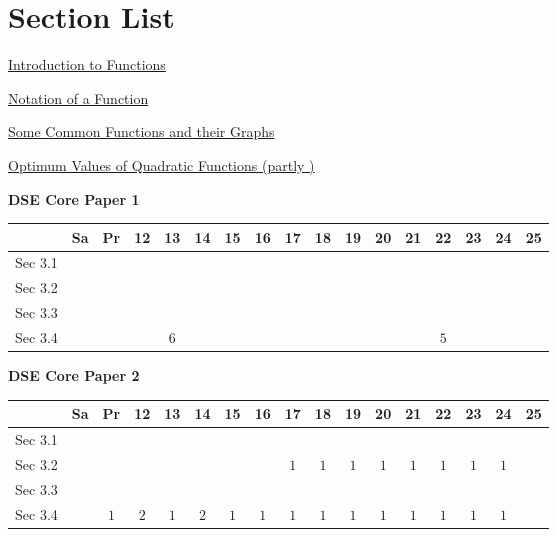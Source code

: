 \documentclass[12pt, a4paper]{article}
\begin{document}
\section*{Section List}
\begin{enumx}[label=Sec 3.\arabic*\ ]
\item \hyperref[section:4-3-1]{Introduction to Functions }
\item \hyperref[section:4-3-2]{Notation of a Function }
\item \hyperref[section:4-3-3]{Some Common Functions and their Graphs}
\item \hyperref[section:4-3-4]{Optimum Values of Quadratic Functions (partly \NF)}
\end{enumx}
\begin{absolutelynopagebreak}
\begin{center}
\textbf{DSE Core Paper 1}
\end{center}
\begin{center}
\begin{tabular}{|l|c|c|c|c|c|c|c|c|c|c|c|c|c|c|c|c|}
\hline
        & Sa & Pr & 12 & 13 & 14 & 15 & 16 & 17 & 18 & 19 & 20 & 21 & 22 & 23 & 24 & 25 \\\hline\hline
Sec 3.1 &  &  &  &  &  &  &  &  &  &  &  &  &  &  &  &  \\\hline
Sec 3.2 &  &  &  &  &  &  &  &  &  &  &  &  &  &  &  &  \\\hline
Sec 3.3 &  &  &  &  &  &  &  &  &  &  &  &  &  &  &  &  \\\hline
Sec 3.4 &  &  &  &  $6$ &  &  &  &  &  &  &  &  &  $5$ &  &  &  \\\hline
\end{tabular}
\end{center}
\end{absolutelynopagebreak}
\begin{absolutelynopagebreak}
\begin{center}
\textbf{DSE Core Paper 2}
\end{center}
\begin{center}
\begin{tabular}{|l|c|c|c|c|c|c|c|c|c|c|c|c|c|c|c|c|}
\hline
        & Sa & Pr & 12 & 13 & 14 & 15 & 16 & 17 & 18 & 19 & 20 & 21 & 22 & 23 & 24 & 25 \\\hline\hline
Sec 3.1 &  &  &  &  &  &  &  &  &  &  &  &  &  &  &  &  \\\hline
Sec 3.2 &  &  &  &  &  &  &  &  $1$ &  $1$ &  $1$ &  $1$ &  $1$ &  $1$ &  $1$ &  $1$ &  \\\hline
Sec 3.3 &  &  &  &  &  &  &  &  &  &  &  &  &  &  &  &  \\\hline
Sec 3.4 &  &  $1$ &  $2$ &  $1$ &  $2$ &  $1$ &  $1$ &  $1$ &  $1$ &  $1$ &  $1$ &  $1$ &  $1$ &  $1$ &  $1$ &  \\\hline
\end{tabular}
\end{center}
\end{absolutelynopagebreak}
\end{document}
